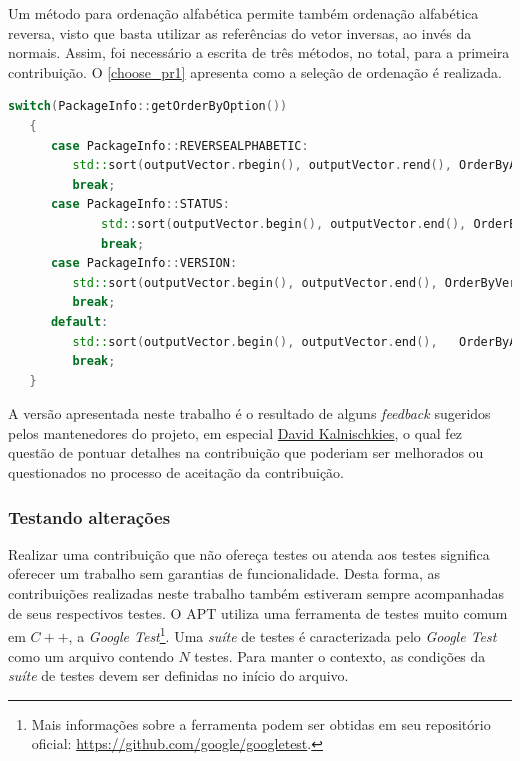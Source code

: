 Um método para ordenação alfabética permite também ordenação alfabética reversa, visto que basta utilizar as referências do vetor inversas, ao invés da normais. Assim, foi necessário a escrita de três métodos, no total, para a primeira contribuição. O \autoref{choose_pr1} apresenta como a seleção de ordenação é realizada.


\begin{lstlisting}[language=C++,label=choose_pr1,caption={Tomada de decisão de ordenação}]
   switch(PackageInfo::getOrderByOption())
   {
      case PackageInfo::REVERSEALPHABETIC:
		 std::sort(outputVector.rbegin(), outputVector.rend(), OrderByAlphabetic);
		 break;
      case PackageInfo::STATUS:
			 std::sort(outputVector.begin(), outputVector.end(), OrderByStatus);
			 break;
      case PackageInfo::VERSION:
		 std::sort(outputVector.begin(), outputVector.end(), OrderByVersion);
		 break;
      default:
		 std::sort(outputVector.begin(), outputVector.end(),   OrderByAlphabetic);
		 break;
   }
\end{lstlisting}

A versão apresentada neste trabalho é o resultado de alguns \textit{feedback} sugeridos pelos mantenedores do projeto, em especial \href{https://github.com/DonKult}{David Kalnischkies}, o qual fez questão de pontuar detalhes na contribuição que poderiam ser melhorados ou questionados no processo de aceitação da contribuição.


\subsubsection*{Testando alterações} %

Realizar uma contribuição que não ofereça testes ou atenda aos testes significa oferecer um trabalho sem garantias de funcionalidade. Desta forma, as contribuições realizadas neste trabalho também estiveram sempre acompanhadas de seus respectivos testes. O {\code APT} utiliza uma ferramenta de testes muito comum em $C++$, a \textit{Google Test}\footnote{Mais informações sobre a ferramenta podem ser obtidas em seu repositório oficial: \url{https://github.com/google/googletest}.}. Uma \textit{suíte} de testes é caracterizada pelo \textit{Google Test} como um arquivo contendo $N$ testes. Para manter o contexto, as condições da \textit{suíte} de testes devem ser definidas no início do arquivo.

